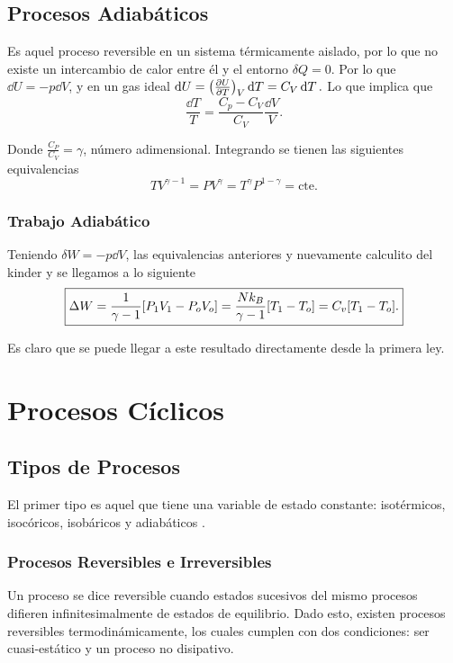 \section{Procesos Adiabáticos}
Es aquel proceso reversible en un sistema térmicamente aislado, por lo que no existe un intercambio de calor entre él y el entorno $\delta Q = 0$. Por lo que $\dd{U} = -p\dd{V}$, y en un gas ideal $\dd{U} = \qty(\pdv{U}{T})_V \dd{T} = C_V \dd{T}.$ Lo que implica que
	$$ \frac{\dd{T}}{T} = \frac{C_p - C_V}{C_V} \frac{\dd{V}}{V}. $$
	
Donde $\frac{C_P}{C_V} = \gamma$, número adimensional. Integrando  se tienen las siguientes equivalencias
	$$ \boxed{ T V ^{\gamma - 1} = PV^\gamma = T^\gamma P^{1 - \gamma} = \text{cte}. } $$
	
\subsection{Trabajo Adiabático}


Teniendo $\delta W = -p\dd{V}$, las equivalencias anteriores y nuevamente calculito del kinder y se llegamos a lo siguiente
	$$ \boxed{ \Delta W = \frac{1}{\gamma - 1} \qty[P_1 V_1 - P_o V_o] = \frac{Nk_B}{\gamma - 1} [T_1 - T_o] = C_v [T_1 - T_o]. } $$
	
Es claro que se puede llegar a este resultado directamente desde la primera ley.



\chapter{Procesos Cíclicos}

\section{Tipos de Procesos}
El primer tipo es aquel que tiene una variable de estado constante: isotérmicos, isocóricos, isobáricos y adiabáticos . 


\subsection{Procesos Reversibles e Irreversibles}
Un proceso se dice reversible cuando estados sucesivos del mismo procesos difieren infinitesimalmente de estados de equilibrio. Dado esto, existen procesos reversibles termodinámicamente, los cuales cumplen con dos condiciones: ser cuasi-estático y un proceso no disipativo.

